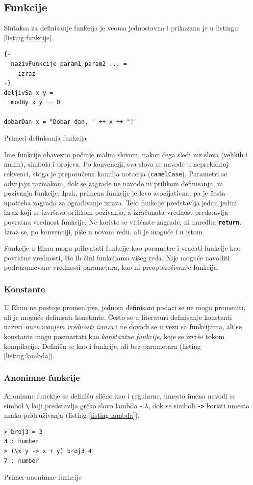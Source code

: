 \documentclass[12pt,oneside]{memoir}
\begin{document}
\subsection{Funkcije}  
Sintaksa za definisanje funkcija je veoma jednostavna i prikazana je u listingu 
\ref{listing:funkcije}.
\begin{listing}[h]
\begin{verbatim}
{-
  nazivFunkcije param1 param2 ... =
    izraz  
-}
deljivSa x y =
  modBy x y == 0

dobarDan x = "Dobar dan, " ++ x ++ "!"  
\end{verbatim}
\caption{Primeri definisanja funkcija}
\label{listing:funkcije}
\end{listing}

Ime funkcije obavezno počinje malim slovom, nakon čega sledi niz slova (velikih i malih),
simbola \texttt{\textbf{\textunderscore}} i brojeva. Po konvenciji, sva slova se navode u
neprekidnoj sekvenci, stoga je preporučena kamilja notacija (\texttt{camelCase}).
Parametri se odvajaju razmakom, dok se zagrade ne navode ni prilikom definisanja, ni
pozivanja funkcije. Ipak, primena funkcije je levo asocijativna, pa je česta upotreba
zagrada za ograđivanje izraza. Telo funkcije predstavlja jedan jedini izraz koji se izvršava
prilikom pozivanja, a izračunata vrednost predstavlja povratnu vrednost funkcije. Ne koriste
se vitičaste zagrade, ni naredba \texttt{\textbf{return}}. Izraz se, po konvenciji, piše u
novom redu, ali je moguće i u istom.

Funkcije u Elmu mogu prihvatati funkcije kao parametre i vraćati funkcije kao 
povratne vrednosti, što ih čini funkcijama višeg reda. Nije moguće navoditi
podrazumevane vrednosti parametara, kao ni preopterećivanje funkcija.

\subsubsection{Konstante}
U Elmu ne postoje promenljive, jednom definisani podaci se ne mogu promeniti, ali je 
moguće definisati konstante. Često se u literaturi definisanje konstanti naziva 
\emph{imenovanjem vrednosti izraza} i ne dovodi se u vezu sa funkcijama, ali se konstante 
mogu posmartati kao \emph{konstantne funkcije}, koje se izvrše tokom kompilacije. Definišu se
kao i funkcije, ali bez parametara (listing \ref{listing:lambda}).

\subsubsection{Anonimne funkcije}
Anonimne funckije se definišu slično kao i regularne, umesto imena navodi se simbol 
\texttt{\textbf{\textbackslash}} koji predstavlja grčko slovo lambda - \(\lambda\),
dok se simboli \texttt{\textbf{->}} koristi umesto znaka pridruživanja (listing \ref{listing:lambda}).
\begin{listing}[h]
\begin{verbatim}
> broj3 = 3
3 : number
> (\x y -> x + y) broj3 4
7 : number
\end{verbatim}
\caption{Primer anonimne funkcije}
\label{listing:lambda}
\end{listing}
\end{document}
